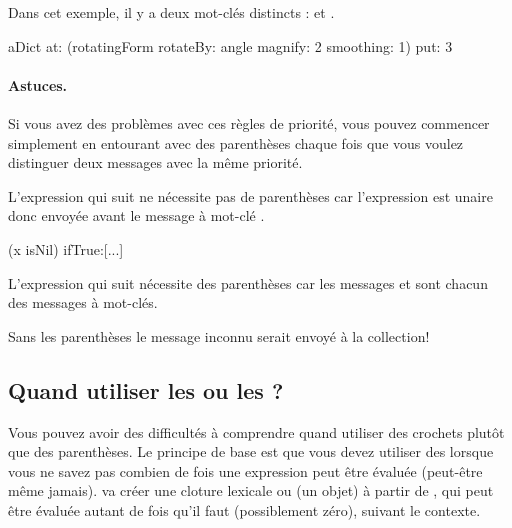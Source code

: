\documentclass[a4paper,10pt,twoside]{book}
\begin{document}
Dans cet exemple, il y a deux mot-cl\'es distincts :  et .

\begin{code}{}
aDict
   at: (rotatingForm 
          rotateBy: angle	
          magnify: 2 
          smoothing: 1)
   put: 3
\end{code}



\paragraph{Astuces.} Si vous avez des probl\`emes avec ces r\`egles de priorit\'e, vous pouvez commencer simplement en entourant avec des parenth\`eses chaque fois que vous voulez distinguer deux messages avec la m\^eme priorit\'e.

L'expression qui suit ne n\'ecessite pas de parenth\`eses car l'expression  est unaire donc envoy\'ee avant le message \`a mot-cl\'e .
\begin{code}{}
(x isNil)
   ifTrue:[...]
\end{code}

L'expression qui suit n\'ecessite des parenth\`eses car les messages  et  sont chacun des messages \`a mot-cl\'es. 

\noindent
Sans les parenth\`eses le message inconnu  serait envoy\'e \`a la collection!

\subsection{Quand utiliser les \lct{[ ]} ou les \lct{( )} ?}

Vous pouvez avoir des difficult\'es \`a comprendre quand utiliser des crochets plut\^ot que des parenth\`eses.
Le principe de base est que vous devez utiliser des \ct{[ ]} lorsque vous ne savez pas combien de fois une expression peut \^etre \'evalu\'ee (peut-\^etre m\^eme jamais).
 va cr\'eer une cloture lexicale ou  (\ie un objet) \`a partir de , qui peut \^etre \'evalu\'ee autant de fois qu'il faut (possiblement z\'ero), suivant le contexte.
\end{document}
